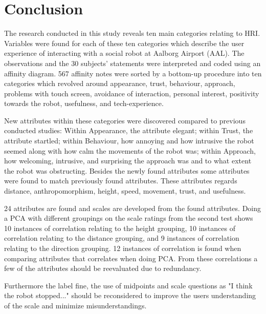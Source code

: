 \section{Conclusion}
\label{Conclusion}
%
The research conducted in this study reveals ten main categories relating to HRI. Variables were found for each of these ten categories which describe the user experience of interacting with a social robot at Aalborg Airport (AAL). The observations and the 30 subjects' statements were interpreted and coded using an affinity diagram. 567 affinity notes were sorted by a bottom-up procedure into ten categories which revolved around appearance, trust, behaviour, approach, problems with touch screen, avoidance of interaction, personal interest, positivity towards the robot, usefulness, and tech-experience.

New attributes within these categories were discovered compared to previous conducted studies: Within Appearance, the attribute elegant; within Trust, the attribute startled; within Behaviour, how annoying and how intrusive the robot seemed along with how calm the movements of the robot was; within Approach, how welcoming, intrusive, and surprising the approach was and to what extent the robot was obstructing. Besides the newly found attributes some attributes were found to match previously found attributes. These attributes regards distance, anthropomorphism, height, speed, movement, trust, and usefulness.

24 attributes are found and scales are developed from the found attributes. Doing a PCA with different groupings on the scale ratings from the second test shows 10 instances of correlation relating to the height grouping, 10 instances of correlation relating to the distance grouping, and 9 instances of correlation relating to the direction grouping. 12 instances of correlation is found when comparing attributes that correlates when doing PCA. From these correlations a few of the attributes should be reevaluated due to redundancy.

Furthermore the label fine, the use of midpoints and scale questions as "I think the robot stopped..." should be reconsidered to improve the users understanding of the scale and minimize misunderstandings. 


